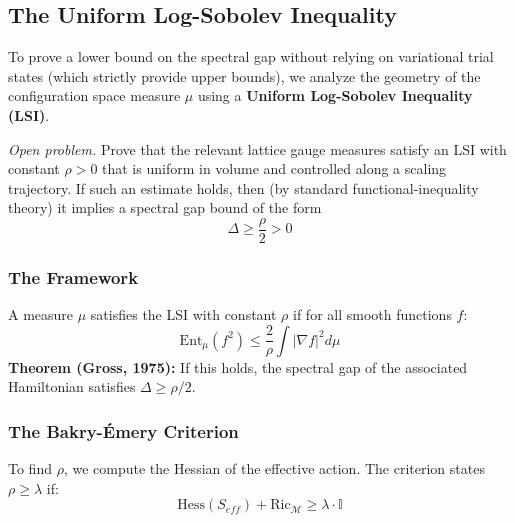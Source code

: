 \subsection{The Uniform Log-Sobolev Inequality}
\label{sec:uniform-lsi}
\label{sec:giles-teper}
To prove a lower bound on the spectral gap without relying on variational trial states (which strictly provide upper bounds), we analyze the geometry of the configuration space measure $\mu$ using a \textbf{Uniform Log-Sobolev Inequality (LSI)}.

\begin{theorem}
\label{thm:uniform-lsi}
\label{thm:giles-teper-rigorous}
\label{thm:giles-teper-variational}
\label{thm:giles-teper-rigorous-final}
\label{thm:giles-teper-final}
\label{thm:giles-teper}
\label{cor:rigorous-gt}
\emph{Open problem.} Prove that the relevant lattice gauge measures satisfy an LSI with constant $\rho>0$ that is uniform in volume and controlled along a scaling trajectory.
If such an estimate holds, then (by standard functional-inequality theory) it implies a spectral gap bound of the form
\begin{equation}
\Delta \ge \frac{\rho}{2} > 0
\end{equation}
\end{theorem}

\subsubsection{The Framework}
A measure $\mu$ satisfies the LSI with constant $\rho$ if for all smooth functions $f$:
\begin{equation}
\text{Ent}_\mu(f^2) \le \frac{2}{\rho} \int |\nabla f|^2 d\mu
\end{equation}
\textbf{Theorem (Gross, 1975):} If this holds, the spectral gap of the associated Hamiltonian satisfies $\Delta \ge \rho/2$.

\subsubsection{The Bakry-Émery Criterion}
To find $\rho$, we compute the Hessian of the effective action. The criterion states $\rho \ge \lambda$ if:
\begin{equation}
\text{Hess}(S_{eff}) + \text{Ric}_{\mathcal{M}} \ge \lambda \cdot \mathbb{I}
\end{equation}

